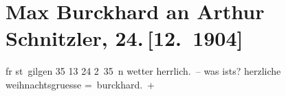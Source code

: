 

         
         \renewcommand{\erwaehntePersonen}{Personen: Karoline Neuberger}
         \renewcommand{\erwaehnteOrte}{Orte: St. Gilgen, Wien}
         \renewcommand{\erwaehnteWerke}{}
               \section[Max Burckhard an Arthur Schnitzler, 24. {[}12. 1904{]}]{ Max Burckhard an Arthur Schnitzler, 24. {[}12. 1904{]}}\nopagebreak{}\rehead{ }\begin{ledgroupsized}[t]{13cm}\normalsize\beginnumbering \toendnotes[C]{\smallbreak\pagebreak[2]} 
\pstart
           {\pb}fr st gilgen 35 13 24{ }2 35 n\pend
           \pstart
           wetter herrlich. – was ists? herzliche weihnachtsgruesse\pend
           \pstart \spacefill\mbox{= burckhard. +}\pend{}
         
         \endnumbering{}\end{ledgroupsized}  \newcommand{\dateiname}{L01482}\newcommand{\titel}{Max Burckhard an Arthur Schnitzler, 24. [12. 1904]}\newcommand{\editorInnen}{Martin Anton Müller und Gerd-Hermann Susen}
      